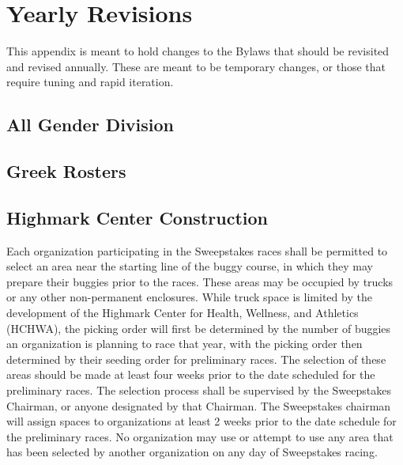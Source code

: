 \section{Yearly Revisions}

This appendix is meant to hold changes to the Bylaws that should be revisited and revised annually. These are meant to be temporary changes, or those that require tuning and rapid iteration. 

\subsection*{All Gender Division} \label{All Gender}

\subsection*{Greek Rosters}

\subsection*{Highmark Center Construction} \label{Seeding Area}
Each organization participating in the Sweepstakes races shall be permitted to select an area near the starting line of the buggy course, in which they may prepare their buggies prior to the races. These areas may be occupied by trucks or any other non-permanent enclosures. While truck space is limited by the development of the Highmark Center for Health, Wellness, and Athletics (HCHWA), the picking order will first be determined by the number of buggies an organization is planning to race that year, with the picking order then determined by their seeding order for preliminary races. The selection of these areas should be made at least four weeks prior to the date scheduled for the preliminary races. The selection process shall be supervised by the Sweepstakes Chairman, or anyone designated by that Chairman. The Sweepstakes chairman will assign spaces to organizations at least 2 weeks prior to the date schedule for the preliminary races. No organization may use or attempt to use any area that has been selected by another organization on any day of Sweepstakes racing.

